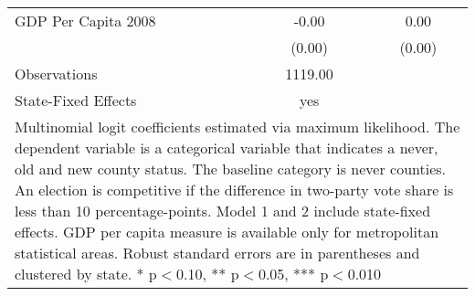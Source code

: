 \begin{table}[!htbp]
\begin{tabular}{l*{2}{c}}
GDP Per Capita 2008 &       -0.00   &        0.00   \\
                    &      (0.00)   &      (0.00)   \\
\hline
Observations        &     1119.00   &               \\
State-Fixed Effects &         yes   &               \\
\hline\hline
\multicolumn{3}{p{\linewidth}}{\footnotesize Multinomial logit coefficients estimated via maximum likelihood. The dependent variable is a categorical variable that indicates a never, old and new county status. The baseline category is never counties. An election is competitive if the difference in two-party vote share is less than 10 percentage-points. Model 1 and 2 include state-fixed effects. GDP per capita measure is available only for metropolitan statistical areas. Robust standard errors are in parentheses and clustered by state. * p$<$0.10, ** p$<$0.05, *** p$<$0.010}\\
\end{tabular}
\end{table}
